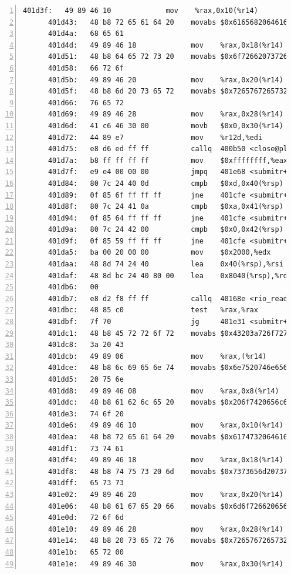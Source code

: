\documentclass{article}
\begin{document}
\begin{lstlisting}[title = bomb的反汇编代码及部分注释, xleftmargin = 2em,xrightmargin = 2em, aboveskip = 1em, numbers = left, basicstyle=\scriptsize\ttfamily, numberstyle=\scriptsize]
      401d3f:	49 89 46 10          	mov    %rax,0x10(%r14)
      401d43:	48 b8 72 65 61 64 20 	movabs $0x6165682064616572,%rax
      401d4a:	68 65 61 
      401d4d:	49 89 46 18          	mov    %rax,0x18(%r14)
      401d51:	48 b8 64 65 72 73 20 	movabs $0x6f72662073726564,%rax
      401d58:	66 72 6f 
      401d5b:	49 89 46 20          	mov    %rax,0x20(%r14)
      401d5f:	48 b8 6d 20 73 65 72 	movabs $0x726576726573206d,%rax
      401d66:	76 65 72 
      401d69:	49 89 46 28          	mov    %rax,0x28(%r14)
      401d6d:	41 c6 46 30 00       	movb   $0x0,0x30(%r14)
      401d72:	44 89 e7             	mov    %r12d,%edi
      401d75:	e8 d6 ed ff ff       	callq  400b50 <close@plt>
      401d7a:	b8 ff ff ff ff       	mov    $0xffffffff,%eax
      401d7f:	e9 e4 00 00 00       	jmpq   401e68 <submitr+0x6bc>
      401d84:	80 7c 24 40 0d       	cmpb   $0xd,0x40(%rsp)
      401d89:	0f 85 6f ff ff ff    	jne    401cfe <submitr+0x552>
      401d8f:	80 7c 24 41 0a       	cmpb   $0xa,0x41(%rsp)
      401d94:	0f 85 64 ff ff ff    	jne    401cfe <submitr+0x552>
      401d9a:	80 7c 24 42 00       	cmpb   $0x0,0x42(%rsp)
      401d9f:	0f 85 59 ff ff ff    	jne    401cfe <submitr+0x552>
      401da5:	ba 00 20 00 00       	mov    $0x2000,%edx
      401daa:	48 8d 74 24 40       	lea    0x40(%rsp),%rsi
      401daf:	48 8d bc 24 40 80 00 	lea    0x8040(%rsp),%rdi
      401db6:	00 
      401db7:	e8 d2 f8 ff ff       	callq  40168e <rio_readlineb>
      401dbc:	48 85 c0             	test   %rax,%rax
      401dbf:	7f 70                	jg     401e31 <submitr+0x685>
      401dc1:	48 b8 45 72 72 6f 72 	movabs $0x43203a726f727245,%rax
      401dc8:	3a 20 43 
      401dcb:	49 89 06             	mov    %rax,(%r14)
      401dce:	48 b8 6c 69 65 6e 74 	movabs $0x6e7520746e65696c,%rax
      401dd5:	20 75 6e 
      401dd8:	49 89 46 08          	mov    %rax,0x8(%r14)
      401ddc:	48 b8 61 62 6c 65 20 	movabs $0x206f7420656c6261,%rax
      401de3:	74 6f 20 
      401de6:	49 89 46 10          	mov    %rax,0x10(%r14)
      401dea:	48 b8 72 65 61 64 20 	movabs $0x6174732064616572,%rax
      401df1:	73 74 61 
      401df4:	49 89 46 18          	mov    %rax,0x18(%r14)
      401df8:	48 b8 74 75 73 20 6d 	movabs $0x7373656d20737574,%rax
      401dff:	65 73 73 
      401e02:	49 89 46 20          	mov    %rax,0x20(%r14)
      401e06:	48 b8 61 67 65 20 66 	movabs $0x6d6f726620656761,%rax
      401e0d:	72 6f 6d 
      401e10:	49 89 46 28          	mov    %rax,0x28(%r14)
      401e14:	48 b8 20 73 65 72 76 	movabs $0x72657672657320,%rax
      401e1b:	65 72 00 
      401e1e:	49 89 46 30          	mov    %rax,0x30(%r14)

\end{lstlisting}
\end{document}
